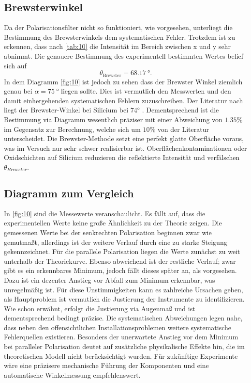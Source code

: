 \subsection{Brewsterwinkel}
\label{sec:disb}
Da der Polarisationsfilter nicht so funktioniert, wie vorgesehen, unterliegt die
Bestimmung des Brewsterwinkels dem systematischen Fehler. Trotzdem ist zu erkennen, 
dass nach \autoref{tab:10} die Intensität im Bereich zwischen x und y 
sehr abnimmt. Die genauere Bestimmung des experimentell bestimmten Wertes 
belief sich auf
\begin{equation*}
    \theta_\text{Brewster} = \qty{68.17}{\degree}.
\end{equation*} 
\noindent In dem Diagramm \autoref{fig:10} ist jedoch zu sehen dass der Brewster Winkel ziemlich genau 
bei $\alpha = \qty{75}{\degree}$ liegen sollte. Dies ist vermutlich den Messwerten und den damit einhergehenden systematischen 
Fehlern zuzuschreiben. 
Der Literatur nach liegt der Brewster-Winkel bei Silicium bei $74°$ \cite{brewster}.
Dementsprechend ist die Bestimmung via Diagramm wesentlich präziser mit einer 
Abweichung von $1.35 \%$ im Gegensatz zur Berechnung, welche sich um $10 \%$
von der Literatur unterscheidet. Die Brewster-Methode setzt eine perfekt glatte
Oberfläche voraus, was im Versuch nur sehr schwer realisierbar ist.
Oberflächenkontaminationen oder Oxidschichten auf Silicium
reduzieren die reflektierte Intensität und verfälschen $\theta_{Brewster}$.

\subsection{Diagramm zum Vergleich}
In \autoref{fig:10} sind die Messewerte veranschaulicht. Es fällt auf, dass 
die experimentellen Werte keine große Ähnlichkeit zu der Theorie zeigen. Die 
gemessenen Werte bei der senkrechten Polarisation beginnen zwar wie gemutmaßt, 
allerdings ist der weitere Verlauf durch eine zu starke Steigung gekennzeichnet. 
Für die parallele Polarisation liegen die Werte zunächst zu weit unterhalb der 
Theoriekurve. Ebenso abweichend ist der restliche Verlauf; zwar gibt es ein 
erkennbares Minimum, jedoch fällt dieses später an, als vorgesehen. Dazu ist 
ein dezenter Anstieg vor Abfall zum Minimum erkennbar, was unregelmäßig ist. 
Für diese Unstimmigkeiten kann es zahlreiche Ursachen geben, als Hauptproblem 
ist vermutlich die Justierung der Instrumente zu identifizieren. Wie schon 
erwähnt, erfolgt die Justierung via Augenmaß und ist dementsprechend bedingt 
präzise. Die systematischen Abweichungen legen nahe, dass neben den 
offensichtlichen Installationsproblemen weitere systematische Fehlerquellen 
existieren. Besonders der unerwartete Anstieg vor dem Minimum bei paralleler
Polarisation deutet auf zusätzliche physikalische Effekte hin, die im 
theoretischen Modell nicht berücksichtigt wurden. Für zukünftige Experimente
wäre eine präzisere mechanische Führung der Komponenten und eine automatische
Winkelmessung empfehlenswert.
